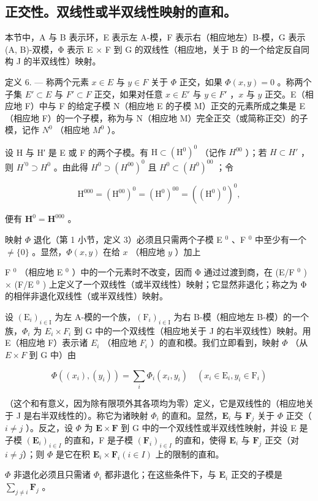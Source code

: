 \subsection{正交性。双线性或半双线性映射的直和。}

本节中，A 与 B 表示环，E 表示左 A-模，F 表示右（相应地左）B-模，G 表示 (A, B)-双模，Φ 表示 E × F 到 G 的双线性（相应地，关于 B 的一个给定反自同构 J 的半双线性）映射。

定义 6. --- 称两个元素 \(x \in E\) 与 \(y \in F\) 关于 \(\Phi\) 正交，如果 \(\Phi(x, y) = 0\) 。称两个子集 \(E' \subset E\) 与 \(F' \subset F\) 正交，如果对任意 \(x \in E'\) 与 \(y \in F'\) ，\(x\) 与 \(y\) 正交。E（相应地 F）中与 F 的给定子模 N（相应地 E 的子模 M）正交的元素所成之集是 E（相应地 F）的一个子模，称为与 N（相应地 M）完全正交（或简称正交）的子模，记作 \(N^0\) （相应地 \(M^0\) ）。

设 H 与 H′ 是 E 或 F 的两个子模。有 \(\mathrm{H}\subset(\mathrm{H}^{0})^{0}\) （记作 \(H^{00}\) ）；若 \(H\subset H'\) ，则 \(H^{\prime0}\supset H^{0}\) 。由此得 \(H^{0}\supset(H^{00})^{0}\) 且 \(H^{0}\subset(H^{0})^{00}\) ；令

\[
\mathrm{H} ^ {0 0 0} = (\mathrm{H} ^ {0 0}) ^ {0} = (\mathrm{H} ^ {0}) ^ {0 0} = ((\mathrm{H} ^ {0}) ^ {0}) ^ {0},
\]

便有 \(\mathbf{H}^0 = \mathbf{H}^{000}\) 。

映射 \(\Phi\) 退化（第 1 小节，定义 3）必须且只需两个子模 E \(^{0}\) 、F \(^{0}\) 中至少有一个 \(\neq \{0\}\) 。显然，\(\Phi(x, y)\) 在给 \(x\) （相应地 \(y\) ）加上

F \(^{0}\) （相应地 E \(^{0}\) ）中的一个元素时不改变，因而 Φ 通过过渡到商，在 (E/F \(^{0}\) ) × (F/E \(^{0}\) ) 上定义了一个双线性（或半双线性）映射；它显然非退化；称之为 Φ 的相伴非退化双线性（或半双线性）映射。

设 \((\mathrm{E}_{i})_{i\in\mathrm{I}}\) 为左 A-模的一个族，\((\mathrm{F}_{i})_{i\in\mathrm{I}}\) 为右 B-模（相应地左 B-模）的一个族，\(\Phi_{i}\) 为 \(E_{i}\times F_{i}\) 到 G 中的一个双线性（相应地关于 J 的右半双线性）映射。用 E（相应地 F）表示诸 \(E_{i}\) （相应地 \(F_{i}\) ）的直和模。我们立即看到，映射 \(\Phi\) （从 \(E\times F\) 到 G 中）由

\[
\Phi ((x _ {i}), (y _ {i})) = \sum_ {i} \Phi_ {i} (x _ {i}, y _ {i}) \quad (x _ {i} \in \mathrm{E} _ {i}, y _ {i} \in \mathrm{F} _ {i})\tag{10}
\]

（这个和有意义，因为除有限项外其各项均为零）定义，它是双线性的（相应地关于 J 是右半双线性的）。称它为诸映射 \(\Phi_{i}\) 的直和。显然，\(\mathbf{E}_{i}\) 与 \(\mathbf{F}_{j}\) 关于 \(\Phi\) 正交（\(i \neq j\) ）。反之，设 \(\Phi\) 为 \(\mathbf{E} \times \mathbf{F}\) 到 G 中的一个双线性或半双线性映射，并设 E 是子模 \((\mathbf{E}_{i})_{i \in I}\) 的直和，F 是子模 \((\mathbf{F}_{i})_{i \in I}\) 的直和，使得 \(\mathbf{E}_{i}\) 与 \(\mathbf{F}_{j}\) 正交（对 \(i \neq j\)）；则 \(\Phi\) 是它在积 \(\mathbf{E}_{i} \times \mathbf{F}_{i} (i \in I)\) 上的限制的直和。

\(\Phi\) 非退化必须且只需诸 \(\Phi_{i}\) 都非退化；在这些条件下，与 \(\mathbf{E}_{i}\) 正交的子模是 \(\sum_{j\neq i}\mathbf{F}_{j}\) 。

